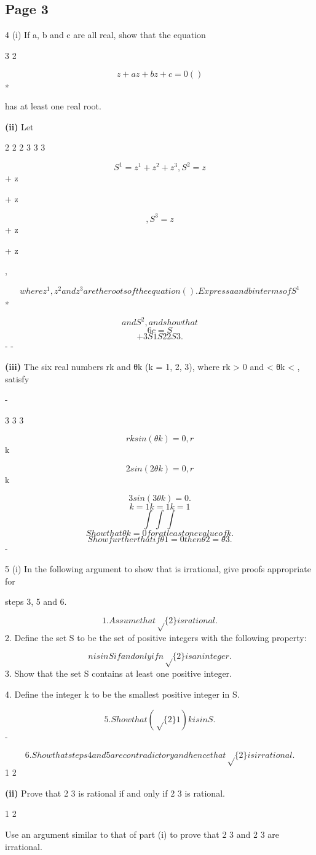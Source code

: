 \documentclass[12pt]{article}
\begin{document}
\subsection*{Page 3}
\begin{flushleft}
4 (i) If a, b and c are all real, show that the equation\par
3 2\par
\[z + az + bz + c = 0 ( )\]
∗\par
has at least one real root.\par
\textbf{(ii)} Let\par
2 2 2 3 3 3\par
\[S^1 = z^1 + z^2 + z^3, S^2 = z\]
+ z\par
+ z\par
\[, S^3 = z\]
+ z\par
+ z\par
,\par
\[where z^1, z^2 and z^3 are the roots of the equation ( ). Express a and b in terms of S^1\]
∗\par
\[and S^2, and show that\]
\[6c = S\]
\[+ 3S1S2 2S3 .\]
- -\par
\textbf{(iii)} The six real numbers rk and θk (k = 1, 2, 3), where rk > 0 and \pi < θk < \pi, satisfy\par
-\par
3 3 3\par
\[rk sin(θk) = 0 , r\]
k\par
\[2 sin(2θk) = 0 , r\]
k\par
\[3 sin(3θk) = 0 .\]
\[k=1 k=1 k=1\]
\[\int \int \int\]
\[Show that θk = 0 for at least one value of k.\]
\[Show further that if θ1 = 0 then θ2 = θ3 .\]
-\par
5 (i) In the following argument to show that  is irrational, give proofs appropriate for\par
steps 3, 5 and 6.\par
\[1. Assume that \sqrt\{2\} is rational.\]
2. Define the set S to be the set of positive integers with the following property:\par
\[n is in S if and only if n\sqrt\{2\} is an integer.\]
3. Show that the set S contains at least one positive integer.\par
4. Define the integer k to be the smallest positive integer in S.\par
\[5. Show that (\sqrt\{2\} 1)k is in S.\]
-\par
\[6. Show that steps 4 and 5 are contradictory and hence that \sqrt\{2\} is irrational.\]
1 2\par
\textbf{(ii)} Prove that 2 3 is rational if and only if 2 3 is rational.\par
1 2\par
Use an argument similar to that of part (i) to prove that 2 3 and 2 3 are irrational.\par
\end{flushleft}
\end{document}
